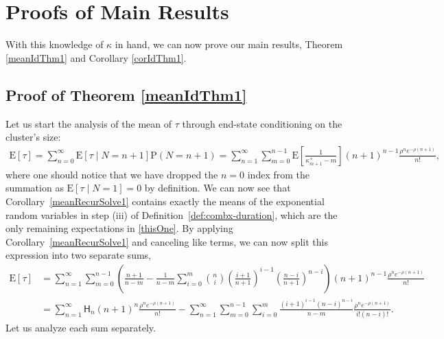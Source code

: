 \documentclass[opre,nonblindrev]{informs3_no_remark}
\newcommand{\E}[1]{{\mathrm{E}\left[#1\right]}}
\newcommand{\PP}[1]{\mathrm{P}\left( #1 \right)}
\begin{document}

\section{Proofs of Main Results}\label{proofSec}

With this knowledge of $\kappa$ in hand, we can now prove our main results, Theorem \ref{meanIdThm1} and Corollary \ref{corIdThm1}. 

\subsection{Proof of Theorem \ref{meanIdThm1}}

Let us start the analysis of the mean of $\tau$ through end-state conditioning on the cluster's size:
\begin{align}
\E{\tau}
=
\sum_{n=0}^\infty \E{\tau \mid N = n+1}\PP{N=n+1}
=
\sum_{n=1}^\infty \sum_{m=0}^{n-1} \E{\frac{1}{\kappa_{m+1}^+-m}}  (n+1)^{n-1} \frac{\rho^n e^{-\rho(n+1)}}{n!} 
,
\label{thisOne}
\end{align}
where one should notice that we have dropped the $n=0$ index from the summation as $\E{\tau \mid N = 1} = 0$ by definition. We can now see that Corollary~\ref{meanRecurSolve1} contains exactly the means of the exponential random variables in step (iii) of Definition~\ref{def:combx-duration}, which are the only remaining expectations in \eqref{thisOne}. By applying Corollary~\ref{meanRecurSolve1} and canceling like terms, we can now split this expression into two separate sums,
\begin{align}
\E{\tau}
&=
\sum_{n=1}^\infty 
\sum_{m=0}^{n-1}
\left(
\frac{n+1}{n-m}
-
\frac{1}{n-m}
\sum_{i=0}^m
{n \choose i}
\left(\frac{i+1}{n+1}\right)^{i-1}
\left(\frac{n-i}{n+1}\right)^{n-i}
\right)
(n+1)^{n-1} \frac{\rho^n e^{-\rho(n+1)}}{n!}
\\
&=
\sum_{n=1}^\infty 
\mathsf{H}_n (n+1)^{n} \frac{\rho^n e^{-\rho(n+1)}}{n!}
-
\sum_{n=1}^\infty
\sum_{m=0}^{n-1}
\sum_{i=0}^m
\frac{\left({i+1}\right)^{i-1}
\left({n-i}\right)^{n-i}}{n-m}
 \frac{\rho^n e^{-\rho(n+1)}}{i!(n-i)!}
 .
 \label{twoSumEq1}
\end{align}
Let us analyze each sum separately. 
\end{document}
